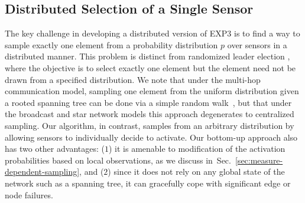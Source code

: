 \documentclass{sig-alternate-dan}
\numberwithin{equation}{section}
\newcommand{\algofont}[1]{\textsc{#1}}
\newcommand{\andreas}[1]{\textcolor{red}{\bf Andreas: #1}}
\newcommand{\cO}{\mathcal{O}}
\newcommand{\EXPthree}{{\algofont{EXP3}}\xspace}
\newcommand{\numsensors}{\ensuremath{n}}
\newcommand{\OPT}{\textsf{OPT}}
\newcommand{\ignore}[1]{}
\newcommand{\commentout}[1]{}
\newcommand{\secref}[1]{Sec.~\ref{#1}}
\newcommand{\paren} [1] {\ensuremath{ \left( {#1} \right) }}
\newtheorem{theorem}{Theorem}
\begin{document}
\subsection{Distributed Selection of a Single Sensor}\label{sec:sampling}

%
%

\ignore{ If we wish to implement a distributed variant of a bandit
algorithm such as \EXPthree, there are two questions we must answer,
namely, how do we sample arms and how do we update the distribution on
arms?  We will now develop a distributed variant of \EXPthree that
solves these challenges.  } %
%
%
%

\commentout{
\andreas{need to move:
\begin{theorem} \label{thm:distributed-single-sensor-selection}
For every $\alpha \in [1, \infty)$ there is a protocol for the
  multiarmed bandit problem such that the worst case expected regret
  is
$\cO(\sqrt{\OPT \numsensors \log \numsensors} + \OPT e^{-\alpha})$, where
  $\OPT$ is the total reward of the best action, and in each round at most 
$\alpha\paren{1 + (e-1)/\alpha}$ sensors communicate with the server and at most 
$2\alpha\paren{1 + (e-1)/\alpha}$ messages are exchanged in
expectation.
Moreover, there is a protocol with worst case expected regret
$\cO(\sqrt{\OPT \numsensors \log \numsensors})$ and in each round 
only $\cO(\log \numsensors)$ sensors  communicate with the server and 
$\cO(\log \numsensors)$ messages are exchanged with high probability.
\end{theorem}
}
} %

%
%
%



\ignore{
The key challenge in developing a distributed version of \EXPthree
when sensors can broadcast to all other sensors is to find a way to
sample exactly one element from a probability distribution $p$ over
sensors in a distributed manner.  We measure the cost of the sampling
procedure in terms of the number of broadcast messages.
}

 The key challenge in developing a distributed version of \EXPthree is
to find a way to sample exactly one element from a probability
distribution $p$ over sensors in a distributed manner. This problem is
distinct from randomized leader election \cite{Nakano02}, where the
objective is to select exactly one element but the element need not be
drawn from a specified distribution.  We note that under the multi-hop
communication model, sampling one element from the uniform
distribution given a rooted spanning tree can be done via a simple
random walk~\cite{Kuhn08}, but that under the broadcast and star network models
this approach degenerates to centralized sampling.  
Our algorithm, in contrast, samples from an arbitrary
distribution by allowing sensors to individually decide to activate.
Our bottom-up approach also has two other advantages:
($1$) it is amenable to modification of the activation probabilities based on
local observations, as we discuss in~\secref{sec:measure-dependent-sampling}, and ($2$)
since it does not rely on any global state of the network such as a
spanning tree, it can gracefully cope with significant edge or node
failures.
%
%
%
\end{document}
